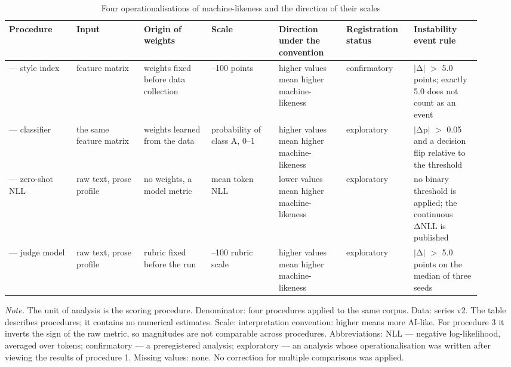 \begin{table}[htbp]
\centering
\small
\caption{Four operationalisations of machine-likeness and the direction of their scales}
\label{tab:2}
\begin{tabular}{>{\raggedright\arraybackslash}p{0.131\linewidth}>{\raggedright\arraybackslash}p{0.131\linewidth}>{\raggedright\arraybackslash}p{0.131\linewidth}>{\raggedright\arraybackslash}p{0.131\linewidth}>{\raggedright\arraybackslash}p{0.131\linewidth}>{\raggedright\arraybackslash}p{0.131\linewidth}>{\raggedright\arraybackslash}p{0.131\linewidth}}
\toprule
Procedure & Input & Origin of weights & Scale & Direction under the convention & Registration status & Instability event rule \\
\midrule
1 — style index & feature matrix & weights fixed before data collection & 0–100 points & higher values mean higher machine-likeness & confirmatory & $|$Δ$|$ $>$ 5.0 points; exactly 5.0 does not count as an event \\
2 — classifier & the same feature matrix & weights learned from the data & probability of class A, 0–1 & higher values mean higher machine-likeness & exploratory & $|$Δp$|$ $>$ 0.05 and a decision flip relative to the threshold \\
3 — zero-shot NLL & raw text, prose profile & no weights, a model metric & mean token NLL & lower values mean higher machine-likeness & exploratory & no binary threshold is applied; the continuous ΔNLL is published \\
4 — judge model & raw text, prose profile & rubric fixed before the run & 0–100 rubric scale & higher values mean higher machine-likeness & exploratory & $|$Δ$|$ $>$ 5.0 points on the median of three seeds \\
\bottomrule
\end{tabular}
\begin{minipage}{\linewidth}\footnotesize\vspace{2pt}
\textit{Note.} The unit of analysis is the scoring procedure. Denominator: four procedures applied to the same corpus. Data: series v2. The table describes procedures; it contains no numerical estimates. Scale: interpretation convention: higher means more AI-like. For procedure 3 it inverts the sign of the raw metric, so magnitudes are not comparable across procedures. Abbreviations: NLL — negative log-likelihood, averaged over tokens; confirmatory — a preregistered analysis; exploratory — an analysis whose operationalisation was written after viewing the results of procedure 1. Missing values: none. No correction for multiple comparisons was applied.
\end{minipage}
\end{table}
